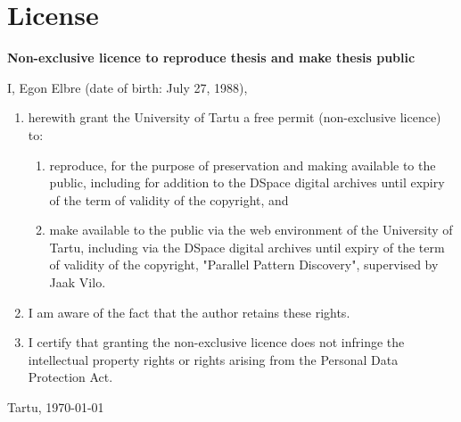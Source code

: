 \chapter*{License}

\textbf{Non-exclusive licence to reproduce thesis and make thesis public}

I, Egon Elbre (date of birth: July 27, 1988),
\begin{enumerate}
	\item herewith grant the University of Tartu a free permit (non-exclusive licence) to:
	\begin{enumerate}
		\item reproduce, for the purpose of preservation and making available to the public, including for addition to the DSpace digital archives until expiry of the term of validity of the copyright, and
		\item make available to the public via the web environment of the University of Tartu, including via the DSpace digital archives until expiry of the term of validity of the copyright, "Parallel Pattern Discovery", supervised by Jaak Vilo.
	\end{enumerate}
	\item I am aware of the fact that the author retains these rights.
	\item I certify that granting the non-exclusive licence does not infringe the intellectual property rights or rights arising from the Personal Data Protection Act.
\end{enumerate}

Tartu, \today